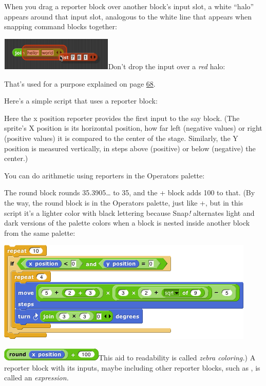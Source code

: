 When you drag a reporter block over another block's input slot, a white
``halo'' appears around that input slot, analogous to the white line
that appears when snapping command blocks together:

\includegraphics[width=2.11111in,height=0.61806in]{media/image71.png}Don't
drop the input over a \emph{red} halo:

That's used for a purpose explained on page
\hyperref[recursive-calls-to-multiple-input-blocks]{68}.

Here's a simple script that uses a reporter block:

Here the x position reporter provides the first input to the say block.
(The sprite's X position is its horizontal position, how far left
(negative values) or right (positive values) it is compared to the
center of the stage. Similarly, the Y position is measured vertically,
in steps above (positive) or below (negative) the center.)

You can do arithmetic using reporters in the Operators palette:

The round block rounds 35.3905\ldots{} to 35, and the + block adds 100
to that. (By the way, the round block is in the Operators palette, just
like +, but in this script it's a lighter color with black lettering
because Snap\emph{!} alternates light and dark versions of the palette
colors when a block is nested inside another block from the same
palette:

\includegraphics[width=4.85417in,height=1.90625in]{media/image80.png}

\includegraphics[width=1.91667in,height=0.23958in]{media/image81.png}This
aid to readability is called \emph{zebra coloring.}) A reporter block
with its inputs, maybe including other reporter blocks, such as , is
called an \emph{expression.}

